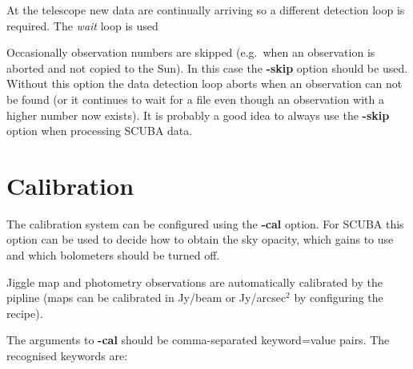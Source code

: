 \documentclass[twoside,11pt]{article}
\newcommand{\xlabel}[1]{}
\renewcommand{\_}{\texttt{\symbol{95}}}
\begin{document}
At the telescope new data are continually arriving so a different detection
loop is required. The \textit{wait} loop is used 

Occasionally observation numbers are skipped (e.g.\ when an observation is
aborted and not copied to the Sun). In this case the \textbf{-skip} option
should be used. Without this option the data detection loop aborts when
an observation can not be found (or it continues to wait for a file even
though an observation with a higher number now exists).
It is probably a good idea to always use the \textbf{-skip}
option when processing SCUBA data.


\section{Calibration\label{sec:cal}\xlabel{calibration}}

The calibration system can be configured using the \textbf{-cal} option.
For SCUBA this option can be used to decide how to obtain the sky opacity,
which gains to use and which bolometers should be turned off.

Jiggle map and photometry observations are automatically calibrated
by the pipline (maps can be calibrated in Jy/beam or Jy/arcsec$^2$
by configuring the recipe).

The arguments to \textbf{-cal} should be comma-separated 
keyword=value pairs. The recognised keywords are:
\end{document}
